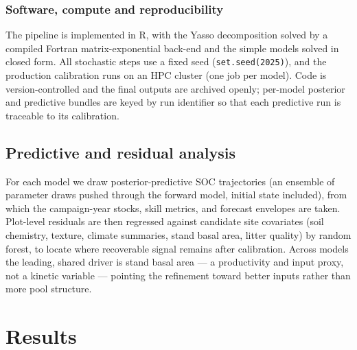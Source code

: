\documentclass[11pt]{article}
\begin{document}
\subsubsection{Software, compute and reproducibility}
The pipeline is implemented in R, with the Yasso decomposition solved by a
compiled Fortran matrix-exponential back-end and the simple models solved in
closed form. All stochastic steps use a fixed seed (\texttt{set.seed(2025)}),
and the production calibration runs on an HPC cluster (one job per model). Code
is version-controlled and the final outputs are archived openly; per-model
posterior and predictive bundles are keyed by run identifier so that each
predictive run is traceable to its calibration.

\subsection{Predictive and residual analysis}
For each model we draw posterior-predictive SOC trajectories (an ensemble of
parameter draws pushed through the forward model, initial state included), from
which the campaign-year stocks, skill metrics, and forecast envelopes are taken.
Plot-level residuals are then regressed against candidate site covariates
(soil chemistry, texture, climate summaries, stand basal area, litter quality)
by random forest, to locate where recoverable signal remains after calibration.
Across models the leading, shared driver is stand basal area --- a productivity
and input proxy, not a kinetic variable --- pointing the refinement toward
better inputs rather than more pool structure.

\section{Results}
%
\end{document}

